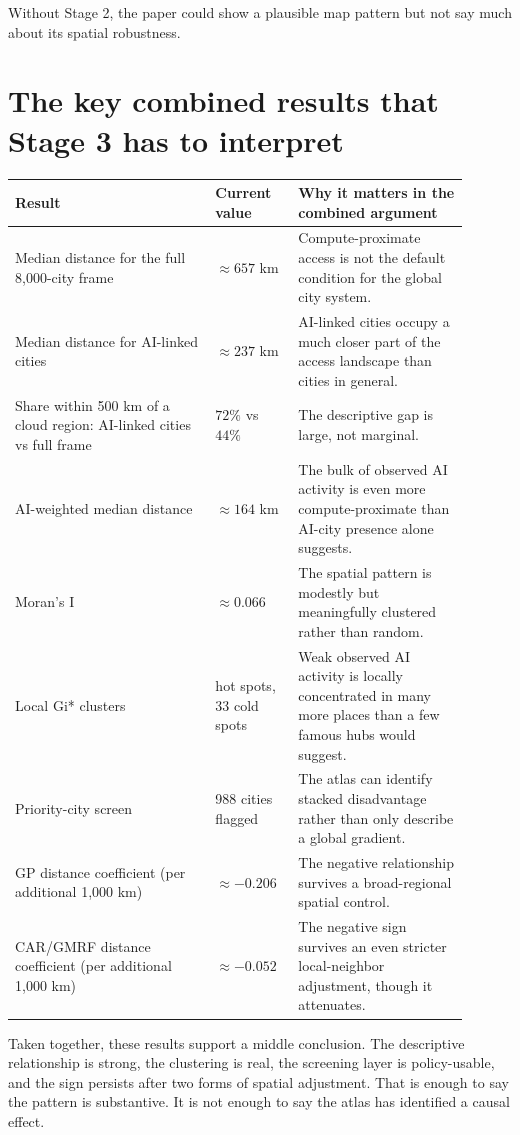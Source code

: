 \documentclass[11pt]{article}
\begin{document}
Without Stage 2, the paper could show a plausible map pattern but not say much about its spatial robustness.

\section{The key combined results that Stage 3 has to interpret}
\begin{longtable}{>{\raggedright\arraybackslash}p{0.40\linewidth} >{\raggedright\arraybackslash}p{0.16\linewidth} >{\raggedright\arraybackslash}p{0.34\linewidth}}
\toprule
\textbf{Result} & \textbf{Current value} & \textbf{Why it matters in the combined argument} \\
\midrule
Median distance for the full 8{,}000-city frame & $\approx 657$ km & Compute-proximate access is not the default condition for the global city system. \\
Median distance for AI-linked cities & $\approx 237$ km & AI-linked cities occupy a much closer part of the access landscape than cities in general. \\
Share within 500 km of a cloud region: AI-linked cities vs full frame & $72\%$ vs $44\%$ & The descriptive gap is large, not marginal. \\
AI-weighted median distance & $\approx 164$ km & The bulk of observed AI activity is even more compute-proximate than AI-city presence alone suggests. \\
Moran's I & $\approx 0.066$ & The spatial pattern is modestly but meaningfully clustered rather than random. \\
Local Gi* clusters & 7 hot spots, 33 cold spots & Weak observed AI activity is locally concentrated in many more places than a few famous hubs would suggest. \\
Priority-city screen & 1{,}988 cities flagged & The atlas can identify stacked disadvantage rather than only describe a global gradient. \\
GP distance coefficient (per additional 1{,}000 km) & $\approx -0.206$ & The negative relationship survives a broad-regional spatial control. \\
CAR/GMRF distance coefficient (per additional 1{,}000 km) & $\approx -0.052$ & The negative sign survives an even stricter local-neighbor adjustment, though it attenuates. \\
\bottomrule
\end{longtable}

Taken together, these results support a middle conclusion. The descriptive relationship is strong, the clustering is real, the screening layer is policy-usable, and the sign persists after two forms of spatial adjustment. That is enough to say the pattern is substantive. It is not enough to say the atlas has identified a causal effect.
\end{document}
